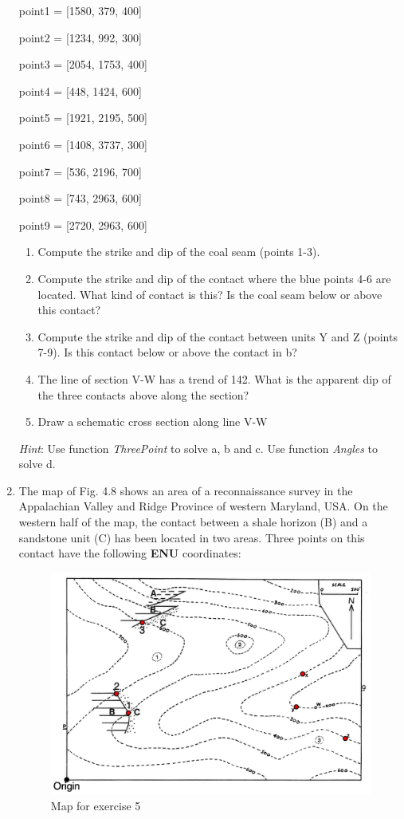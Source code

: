 \documentclass[a4paper , 12pt]{book}
\begin{document}
\begin{enumerate}
    point1 = [1580, 379, 400]
    
    point2 = [1234, 992, 300]
    
    point3 = [2054, 1753, 400]
    
    point4 = [448, 1424, 600]
    
    point5 = [1921, 2195, 500]
    
    point6 = [1408, 3737, 300]
    
    point7 = [536, 2196, 700]
    
    point8 = [743, 2963, 600]
    
    point9 = [2720, 2963, 600]
    
    \begin{enumerate}
        \item Compute the strike and dip of the coal seam (points 1-3).
        \item Compute the strike and dip of the contact where the blue points 4-6 are located. What kind of contact is this? Is the coal seam below or above this contact?
        \item Compute the strike and dip of the contact between units Y and Z (points 7-9). Is this contact below or above the contact in b?
        \item The line of section V-W has a trend of 142\degree. What is the apparent dip of the three contacts above along the section?
        \item Draw a schematic cross section along line V-W
    \end{enumerate}
    
    \textit{Hint}: Use function \textit{ThreePoint} to solve a, b and c. Use function \textit{Angles} to solve d.
    
    \item The map of Fig. 4.8 shows an area of a reconnaissance survey in the Appalachian Valley and Ridge Province of western Maryland, USA. On the western half of the map, the contact between a shale horizon (B) and a sandstone unit (C) has been located in two areas. Three points on this contact have the following \textbf{ENU} coordinates:
    
     \begin{figure}[ht]
    \centering
    \includegraphics[width=12cm]{Figures/ch4f9.png}
    \caption{Map for exercise 5}
    \end{figure}
    

\end{enumerate}
\end{document}

